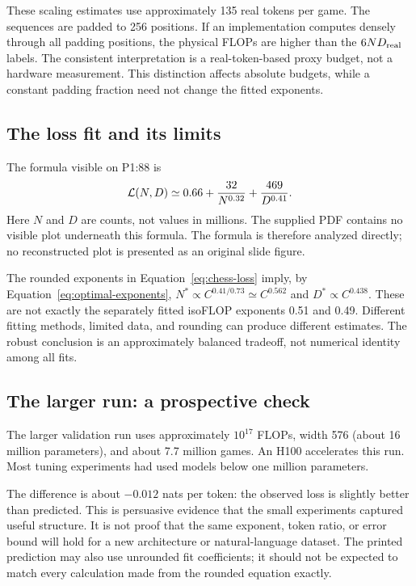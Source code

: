 These scaling estimates use approximately 135 real tokens per game. The sequences are padded to 256 positions. If an implementation computes densely through all padding positions, the physical FLOPs are higher than the $6N D_{\rm real}$ labels. The consistent interpretation is a real-token-based proxy budget, not a hardware measurement. This distinction affects absolute budgets, while a constant padding fraction need not change the fitted exponents.

\subsection{The loss fit and its limits}
The formula visible on P1:88 is
\begin{equation}
\mathcal L(N,D)\simeq0.66+\frac{32}{N^{0.32}}+\frac{469}{D^{0.41}}.
\label{eq:chess-loss}
\end{equation}
Here $N$ and $D$ are counts, not values in millions. The supplied PDF contains no visible plot underneath this formula. The formula is therefore analyzed directly; no reconstructed plot is presented as an original slide figure.

The rounded exponents in Equation~\eqref{eq:chess-loss} imply, by Equation~\eqref{eq:optimal-exponents}, $N^*\propto C^{0.41/0.73}\simeq C^{0.562}$ and $D^*\propto C^{0.438}$. These are not exactly the separately fitted isoFLOP exponents 0.51 and 0.49. Different fitting methods, limited data, and rounding can produce different estimates. The robust conclusion is an approximately balanced tradeoff, not numerical identity among all fits.

\subsection{The larger run: a prospective check}
The larger validation run uses approximately $10^{17}$ FLOPs, width 576 (about 16 million parameters), and about 7.7 million games. An H100 accelerates this run. Most tuning experiments had used models below one million parameters.


The difference is about $-0.012$ nats per token: the observed loss is slightly better than predicted. This is persuasive evidence that the small experiments captured useful structure. It is not proof that the same exponent, token ratio, or error bound will hold for a new architecture or natural-language dataset. The printed prediction may also use unrounded fit coefficients; it should not be expected to match every calculation made from the rounded equation exactly.

\FloatBarrier
